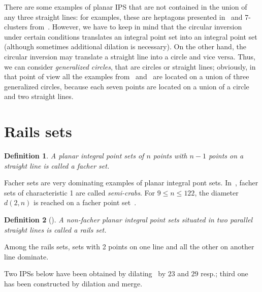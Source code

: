 \documentclass[12pt]{article}
\theoremstyle{theorem}
\theoremstyle{dfn}
\newtheorem{dfn}{Definition}
\theoremstyle{remark}
\begin{document}
There are some examples of planar IPS that are not contained in the union of any three straight lines:
for examples, these are heptagons presented in~\cite{kreisel2008heptagon} and 7-clusters from~\cite{kurz2013constructing}.
However, we have to keep in mind that the circular inversion under certain conditions
translates an integral point set into an integral point set
(although sometimes additional dilation is necessary).
On the other hand, the circular inversion may translate a straight line into a circle and vice versa.
Thus, we can consider \emph{generalized circles}, that are circles or straight lines;
obviously, in that point of view all the examples from~\cite{kreisel2008heptagon} and~\cite{kurz2013constructing}
are located on a union of three generalized circles,
because each seven points are located on a union of a circle and two straight lines.




\section{Rails sets}

\begin{dfn}
	A planar integral point sets of $n$ points with $n-1$ points on a straight line is called
	a \textit{facher} set.
\end{dfn}
Facher sets are very dominating examples of planar integral pont sets.
In~\cite{antonov2008maximal}, facher sets of characteristic 1 are called \textit{semi-crabs}.
For $9 \leq n \leq 122$, the diameter $d(2,n)$ is reached on a facher point set~\cite{kurz2008minimum}.

\begin{dfn}[\cite{avdeev2019particular}]
	A non-facher planar integral point sets situated in two parallel straight lines
	is called a \textit{rails} set.
\end{dfn}

Among the rails sets, sets with 2 points on one line and all the other on another line dominate.


Two IPSs below have been obtained by dilating~\cite[Fig. 34]{avdeev2019particular} by $23$ and $29$  resp.;
third one has been constructed by dilation and merge.
\end{document}
